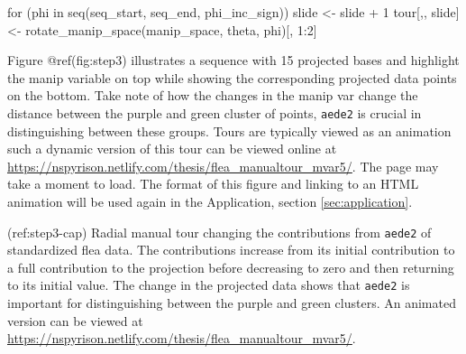 \begin{Schunk}
\begin{Sinput}
for (phi in seq(seq_start, seq_end, phi_inc_sign)) {
  slide <- slide + 1
  tour[,, slide] <- rotate_manip_space(manip_space, theta, phi)[, 1:2]
}
\end{Sinput}
\end{Schunk}

Figure @ref(fig:step3) illustrates a sequence with 15 projected bases and highlight the manip variable on top while showing the corresponding projected data points on the bottom. Take note of how the changes in the manip var change the distance between the purple and green cluster of points, \texttt{aede2} is crucial in distinguishing between these groups. Tours are typically viewed as an animation such a dynamic version of this tour can be viewed online at \url{https://nspyrison.netlify.com/thesis/flea_manualtour_mvar5/}. The page may take a moment to load. The format of this figure and linking to an HTML animation will be used again in the Application, section \ref{sec:application}.

(ref:step3-cap) Radial manual tour changing the contributions from \texttt{aede2} of standardized flea data. The contributions increase from its initial contribution to a full contribution to the projection before decreasing to zero and then returning to its initial value. The change in the projected data shows that \texttt{aede2} is important for distinguishing between the purple and green clusters. An animated version can be viewed at \url{https://nspyrison.netlify.com/thesis/flea_manualtour_mvar5/}.


